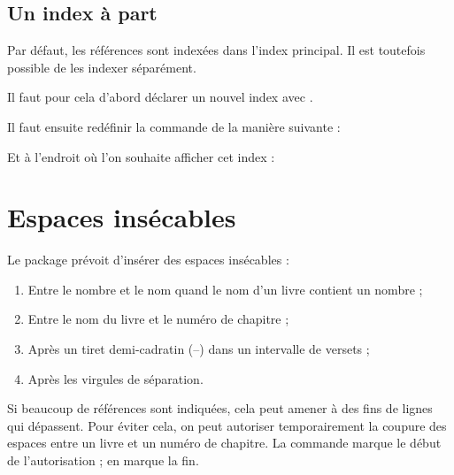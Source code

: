 \subsection{Un index à part}

Par défaut, les références sont indexées dans l'index principal. Il est toutefois possible  de les indexer séparément.

Il faut pour cela d'abord déclarer un nouvel index avec .

\begin{latexcode}
\end{latexcode}

Il faut ensuite redéfinir la commande  de la manière suivante :

\begin{latexcode}
\renewcommand{\biblerefindex}[0]{\index[bible]}
\end{latexcode}

Et à l'endroit où l'on souhaite afficher cet index :

\begin{latexcode}
\printindex[bible]
\end{latexcode}

\section{Espaces insécables}

Le package  prévoit d'insérer des espaces insécables :
\begin{enumerate}
\item Entre le nombre et le nom quand le nom d’un livre contient un nombre ;
\item Entre le nom du livre et le numéro de chapitre ;
\item Après un tiret demi-cadratin (–) dans un intervalle de versets ; 
\item Après les virgules de séparation.
\end{enumerate}

Si beaucoup de références sont indiquées, cela peut amener à des fins de lignes qui dépassent.
Pour éviter cela, on peut autoriser temporairement la coupure des espaces entre un livre et un numéro de chapitre. La commande  marque le début de l'autorisation ;  en marque la fin.

